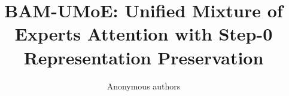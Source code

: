 \title{\textbf{BAM-UMoE: Unified Mixture of Experts Attention with Step-0 Representation Preservation}}

\author{Anonymous authors}
